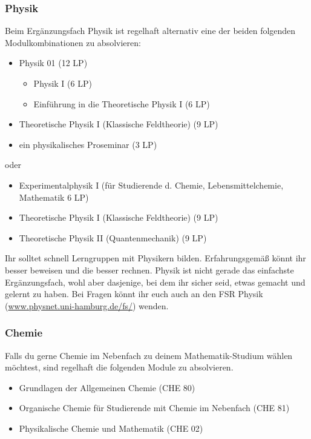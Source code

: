 \clearpage

\subsubsection{Physik}

Beim Ergänzungsfach Physik ist regelhaft alternativ eine der
beiden folgenden Modulkombinationen zu absolvieren:

\begin{itemize}\itemsep 0pt
    \item Physik 01 (12 LP)
          \begin{itemize}\itemsep 0pt
              \item Physik I (6 LP)
              \item Einführung in die Theoretische Physik I (6 LP)
          \end{itemize}
    \item Theoretische Physik I (Klassische Feldtheorie) (9 LP)
    \item ein physikalisches Proseminar (3 LP)
\end{itemize}
oder
\begin{itemize}\itemsep 0pt
    \item Experimentalphysik I (für Studierende d. Chemie, Lebensmittelchemie,
    Mathematik 6 LP)
    \item Theoretische Physik I (Klassische Feldtheorie) (9 LP)
    \item Theoretische Physik II (Quantenmechanik) (9 LP)
\end{itemize}

Ihr solltet schnell Lerngruppen mit Physikern bilden.  Erfahrungsgemäß könnt
ihr besser beweisen und die besser rechnen. Physik ist nicht gerade das
einfachste Ergänzungsfach, wohl aber dasjenige, bei dem ihr sicher seid, etwas
gemacht und gelernt zu haben. Bei Fragen könnt ihr euch auch an den FSR Physik
(\url{www.physnet.uni-hamburg.de/fs/}) wenden.

\subsubsection{Chemie}

Falls du gerne Chemie im Nebenfach zu deinem Mathematik-Studium wählen
möchtest, sind regelhaft die folgenden Module zu absolvieren.

\begin{itemize}\itemsep 0pt
    \item Grundlagen der Allgemeinen Chemie (CHE 80)
    \item Organische Chemie für Studierende mit Chemie im Nebenfach  (CHE 81)
    \item Physikalische Chemie und Mathematik (CHE 02)
\end{itemize}

